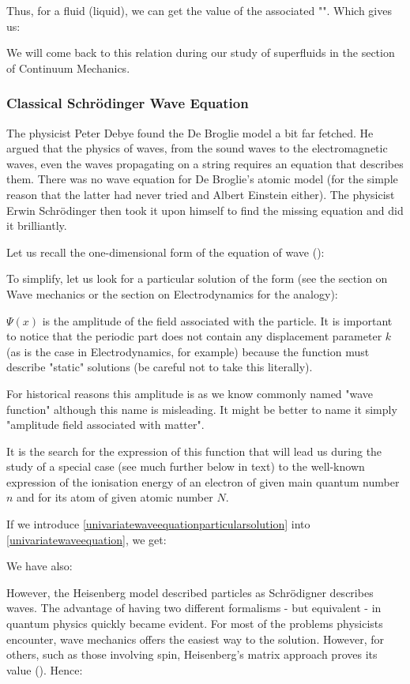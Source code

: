 	Thus, for a fluid (liquid), we can get the value of the associated "". Which gives us:
	
	We will come back to this relation during our study of superfluids in the section of Continuum Mechanics.
	
	\pagebreak
	\subsubsection{Classical Schrödinger Wave Equation}
	The physicist Peter Debye found the De Broglie model a bit far fetched. He argued that the physics of waves, from the sound waves to the electromagnetic waves, even the waves propagating on a string requires an equation that describes them. There was no wave equation for De Broglie's atomic model (for the simple reason that the latter had never tried and Albert Einstein either). The physicist Erwin Schrödinger then took it upon himself to find the missing equation and did it brilliantly.

	Let us recall the one-dimensional form of the equation of wave ():
	
	To simplify, let us look for a particular solution of the form (see the section on Wave mechanics or the section on Electrodynamics for the analogy):
	
	$\Psi(x)$ is the amplitude of the field associated with the particle. It is important to notice that the periodic part does not contain any displacement parameter $k$ (as is the case in Electrodynamics, for example) because the function must describe "static" solutions (be careful not to take this literally).
	
	For historical reasons this amplitude is as we know commonly named "wave function" although this name is misleading. It might be better to name it simply "amplitude field associated with matter".
	
	It is the search for the expression of this function that will lead us during the study of a special case (see much further below in text) to the well-known expression of the ionisation energy of an electron of given main quantum number $n$ and for its atom of given atomic number $N$.
	
	If we introduce \ref{univariatewaveequationparticularsolution} into \ref{univariatewaveequation}, we get:
	
	We have also:
	
	However, the Heisenberg model described particles as Schrödigner describes waves. The advantage of having two different formalisms - but equivalent - in quantum physics quickly became evident. For most of the problems physicists encounter, wave mechanics offers the easiest way to the solution. However, for others, such as those involving spin, Heisenberg's matrix approach proves its value ().
	Hence:
	
